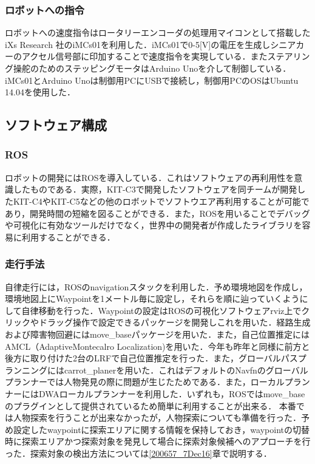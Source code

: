 \documentclass[10pt,a4paper]{jarticle}
\begin{document}
\subsubsection{ロボットへの指令}
ロボットへの速度指令はロータリーエンコーダの処理用マイコンとして搭載した iXs Research 社のiMCs01を利用した．iMCs01で0-5[V]の電圧を生成しシニアカーのアクセル信号部に印加することで速度指令を実現している．またステアリング操舵のためのステッピングモータはArduino Unoを介して制御している．iMCs01とArduino Unoは制御用PCにUSBで接続し，制御用PCのOSはUbuntu 14.04を使用した．

\subsection{ソフトウェア構成}
\subsubsection{ROS}
ロボットの開発にはROSを導入している．これはソフトウェアの再利用性を意識したものである．実際，KIT-C3で開発したソフトウェアを同チームが開発したKIT-C4やKIT-C5などの他のロボットでソフトウエア再利用することが可能であり，開発時間の短縮を図ることができる．また，ROSを用いることでデバッグや可視化に有効なツールだけでなく，世界中の開発者が作成したライブラリを容易に利用することができる．

\subsubsection{走行手法}
自律走行には，ROSのnavigationスタックを利用した．予め環境地図を作成し，環境地図上にWaypointを1メートル毎に設定し，それらを順に辿っていくようにして自律移動を行った．Waypointの設定はROSの可視化ソフトウェアrviz上でクリックやドラッグ操作で設定できるパッケージを開発しこれを用いた．経路生成および障害物回避にはmove\_baseパッケージを用いた．また，自己位置推定にはAMCL（AdaptiveMontecalro Localization)を用いた．今年も昨年と同様に前方と後方に取り付けた2台のLRFで自己位置推定を行った．また，グローバルパスプランニングにはcarrot\_planerを用いた．これはデフォルトのNavfnのグローバルプランナーでは人物発見の際に問題が生じたためである．また，ローカルプランナーにはDWAローカルプランナーを利用した．いずれも，ROSではmove\_baseのプラグインとして提供されているため簡単に利用することが出来る．
本番では人物探索を行うことが出来なかったが，人物探索についても準備を行った．予め設定したwaypointに探索エリアに関する情報を保持しておき，waypointの切替時に探索エリアかつ探索対象を発見して場合に探索対象候補へのアプローチを行った．探索対象の検出方法については\ref{200657_7Dec16}章で説明する．
\end{document}

